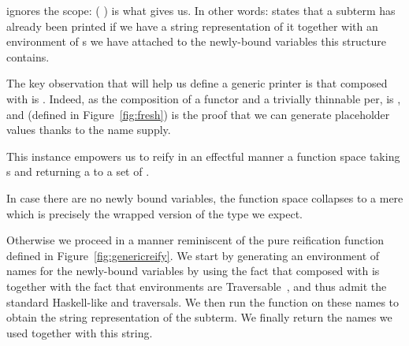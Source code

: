 ignores the scope: ({ \AF{++} }) is what  gives us.
%
In other words:  states that a subterm has already been printed
if we have a string representation of it together with an environment of
s we have attached to the newly-bound variables this structure
contains.
%
\begin{agdasnippet}
\end{agdasnippet}
%
The key observation that will help us define a generic printer is that
 composed with  is . Indeed, as the
composition of a functor and a trivially thinnable per,
 is , and  (defined in
Figure~\ref{fig:fresh}) is the proof that we can generate
placeholder values thanks to the name supply.

\begin{agdasnippet}
\end{agdasnippet}

This  instance empowers us to reify in an effectful manner
a  function space taking s and returning a 
to a set of .

\begin{agdasnippet}
\end{agdasnippet}

In case there are no newly bound variables, the  function space
collapses to a mere  which is precisely the wrapped version of
the type we expect.

\begin{agdasnippet}
\end{agdasnippet}

Otherwise we proceed in a manner reminiscent of the pure reification function
defined in Figure~\ref{fig:genericreify}. We start by generating an environment
of names for the newly-bound variables by using the fact that  composed
with  is  together with the fact that environments are
Traversable~\cite{mcbride_paterson_2008}, %
and thus admit the standard Haskell-like  and 
traversals. %
We then run the  function
on these names to obtain the string representation of the subterm. We finally
return the names we used together with this string.

